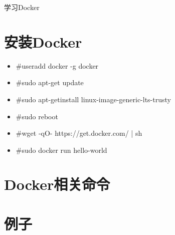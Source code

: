 \documentclass[a4paper,12pt]{ctexart}
\begin{document}
\begin{center}
学习Docker
\end{center}


\section{安装Docker~\cite{安装Docker步骤}}
\begin{itemize}
	\item \#useradd docker -g docker %
	\item \#sudo apt-get update %
	\item \#sudo apt-getinstall linux-image-generic-lts-trusty %
	\item \#sudo reboot
	\item \#wget -qO- https://get.docker.com/ | sh %
	\item \#sudo docker run hello-world %
\end{itemize}

\section{Docker相关命令}
\section{例子}




%
%

%
\end{document}
